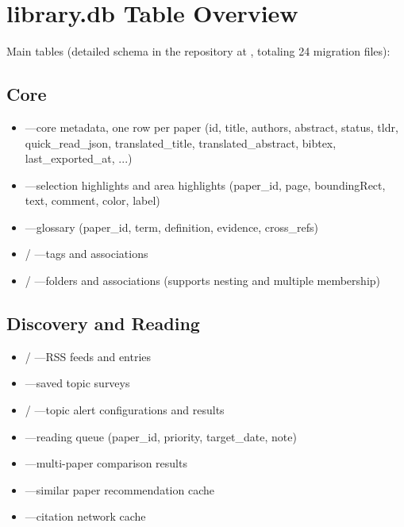 \section{library.db Table Overview}

Main tables (detailed schema in the repository at , totaling
24 migration files):

\subsection{Core}

\begin{itemize}
  \item {}---core metadata, one row per paper (id, title, authors, abstract, status,
    tldr, quick\_read\_json, translated\_title, translated\_abstract, bibtex,
    last\_exported\_at, ...)
  \item {}---selection highlights and area highlights (paper\_id, page,
    boundingRect, text, comment, color, label)
  \item {}---glossary (paper\_id, term, definition, evidence, cross\_refs)
  \item {} / ---tags and associations
  \item {} / ---folders and associations (supports nesting
    and multiple membership)
\end{itemize}

\subsection{Discovery and Reading}

\begin{itemize}
  \item {} / ---RSS feeds and entries
  \item {}---saved topic surveys
  \item {} / ---topic alert configurations
    and results
  \item {}---reading queue (paper\_id, priority, target\_date, note)
  \item {}---multi-paper comparison results
  \item {}---similar paper recommendation cache
  \item {}---citation network cache
\end{itemize}

